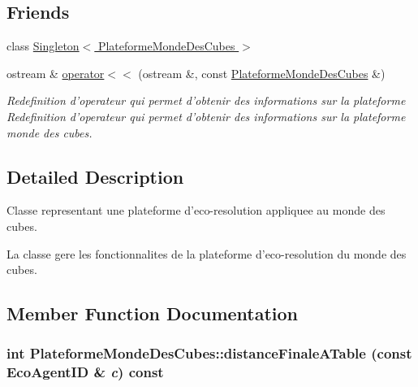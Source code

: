 \subsection*{Friends}
\begin{CompactItemize}
\item 
\hypertarget{classPlateformeMondeDesCubes_95609583990e9782a41cc432bdd2578d}{
class \hyperlink{classPlateformeMondeDesCubes_95609583990e9782a41cc432bdd2578d}{Singleton$<$ PlateformeMondeDesCubes $>$}}
\label{classPlateformeMondeDesCubes_95609583990e9782a41cc432bdd2578d}

\item 
\hypertarget{classPlateformeMondeDesCubes_98d6997efa9a51e23997364f1f09c7bd}{
ostream \& \hyperlink{classPlateformeMondeDesCubes_98d6997efa9a51e23997364f1f09c7bd}{operator$<$$<$} (ostream \&, const \hyperlink{classPlateformeMondeDesCubes}{PlateformeMondeDesCubes} \&)}
\label{classPlateformeMondeDesCubes_98d6997efa9a51e23997364f1f09c7bd}

\begin{CompactList}\small\item\em Redefinition d'operateur qui permet d'obtenir des informations sur la plateforme Redefinition d'operateur qui permet d'obtenir des informations sur la plateforme monde des cubes. \item\end{CompactList}\end{CompactItemize}


\subsection{Detailed Description}
Classe representant une plateforme d'eco-resolution appliquee au monde des cubes. 

La classe gere les fonctionnalites de la plateforme d'eco-resolution du monde des cubes. 

\subsection{Member Function Documentation}
\hypertarget{classPlateformeMondeDesCubes_7f694f86cf4a9502cf6bba2d6eb5a371}{
\subsubsection[{distanceFinaleATable}]{\setlength{\rightskip}{0pt plus 5cm}int PlateformeMondeDesCubes::distanceFinaleATable (const {\bf EcoAgentID} \& {\em c}) const}}
\label{classPlateformeMondeDesCubes_7f694f86cf4a9502cf6bba2d6eb5a371}


